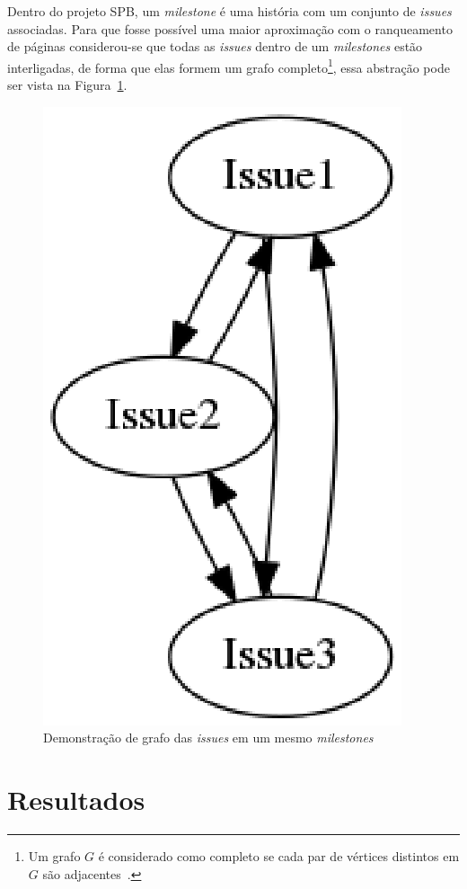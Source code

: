 Dentro do projeto SPB, um \textit{milestone} é uma história com um conjunto de \textit{issues} associadas. Para que fosse possível uma maior aproximação com o ranqueamento de páginas considerou-se que todas as \textit{issues} dentro de um \textit{milestones} estão interligadas, de forma que elas formem um grafo completo\footnote{Um grafo $G$ é considerado como completo se cada par de vértices distintos em $G$ são adjacentes~\cite{bang}.}, essa abstração pode ser vista na Figura~\ref{fig:milestone-graph}.

\begin{figure}[!h]
    \centering
        \includegraphics[keepaspectratio=true,scale=0.5]{figuras/milestone-graph.eps}
    \caption{Demonstração de grafo das \textit{issues} em um mesmo  \textit{milestones}}
    \label{fig:milestone-graph}
\end{figure}

\newpage
\section{Resultados}
\label{est:res}

